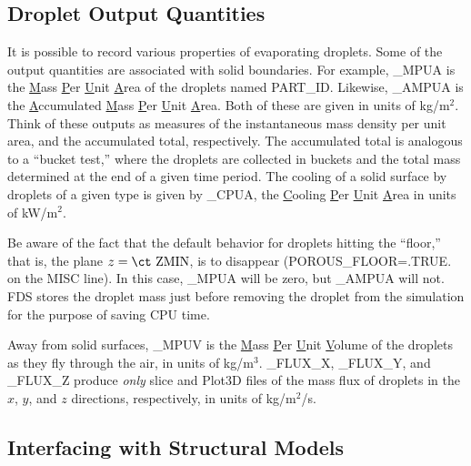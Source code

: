 \documentclass[11pt]{book}
\begin{document}
\subsection{Droplet Output Quantities}
\label{info:part_output}

It is possible to record various properties of evaporating droplets. Some of the output quantities are associated with solid boundaries. For example,
{\ct [PART\_ID]\_MPUA} is the \underline{M}ass \underline{P}er \underline{U}nit \underline{A}rea of the droplets named
{\ct PART\_ID}. Likewise, {\ct [PART\_ID]\_AMPUA} is the \underline{A}ccumulated \underline{M}ass \underline{P}er \underline{U}nit \underline{A}rea. Both of these
are given in units of kg/m$^2$. Think of these outputs as measures of the instantaneous mass density per unit area, and the accumulated total, respectively. The
accumulated total is analogous to a ``bucket test,'' where the droplets are collected in buckets and the total mass determined at the end of a given time
period. The cooling of a solid surface by droplets of a given type is given by {\ct [PART\_ID]\_CPUA}, the \underline{C}ooling \underline{P}er \underline{U}nit \underline{A}rea
in units of kW/m$^2$.

Be aware of the fact that the default behavior for droplets hitting the ``floor,'' that is, the plane $z=\hbox{\ct ZMIN}$, is to disappear ({\ct POROUS\_FLOOR=.TRUE.} on the
{\ct MISC} line). 
In this case, {\ct [PART\_ID]\_MPUA} will be zero, but {\ct [PART\_ID]\_AMPUA} will not. FDS stores the droplet mass just before removing the droplet from
the simulation for the purpose of saving CPU time.

Away from solid surfaces, {\ct [PART\_ID]\_MPUV} is the \underline{M}ass \underline{P}er \underline{U}nit \underline{V}olume of the droplets as they fly through
the air, in units of kg/m$^3$.  {\ct [PART\_ID]\_FLUX\_X},  {\ct [PART\_ID]\_FLUX\_Y}, and {\ct [PART\_ID]\_FLUX\_Z} produce {\em only} slice and Plot3D files
of the mass flux of droplets in the $x$, $y$, and $z$ directions, respectively, in units of kg/m$^2$/s.




\subsection{Interfacing with Structural Models}
\label{info:AST}
\end{document}
